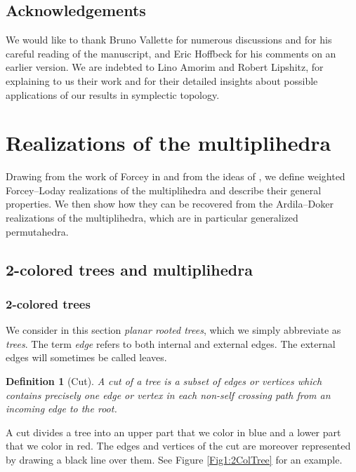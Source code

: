 \documentclass[twoside, 12pt]{amsart}
\newtheorem{definition}{Definition}[section]
\theoremstyle{remark}
\begin{document}
\subsection*{Acknowledgements} 
We would like to thank Bruno Vallette for numerous discussions and for his careful reading of the manuscript, and Eric Hoffbeck for his comments on an earlier version.
We are indebted to Lino Amorim and Robert Lipshitz, for explaining to us their work and for their detailed insights about possible applications of our results in symplectic topology. 



\section{Realizations of the multiplihedra} 
\label{sec:I}

Drawing from the work of Forcey in \cite{Forcey08} and from the ideas of \cite{MTTV19}, we define weighted Forcey--Loday realizations of the multiplihedra and describe their general properties.
We then show how they can be recovered from the Ardila--Doker realizations of the multiplihedra, which are in particular generalized permutahedra.


\subsection{2-colored trees and multiplihedra}

\subsubsection{2-colored trees}

We consider in this section \textit{planar rooted trees}, which we simply abbreviate as \textit{trees}. The term \emph{edge} refers to both internal and external edges. The external edges will sometimes be called leaves. 

\begin{definition}[Cut]
A \emph{cut} of a tree is a subset of edges or vertices which contains precisely one edge or vertex in each non-self crossing path from an incoming edge to the root.
\end{definition}

\noindent A cut divides a tree into an upper part that we color in blue and a lower part that we color in red. The edges and vertices of the cut are moreover represented by drawing a black line over them. See Figure \ref{Fig1:2ColTree} for an example. 
\end{document}

